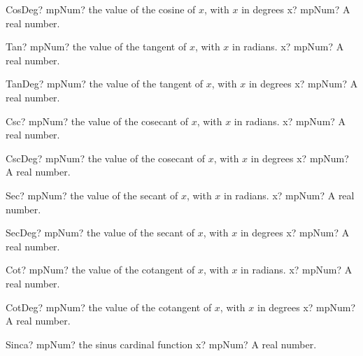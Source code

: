 \documentclass[12pt,a4paper,openany]{book}
\begin{document}
\begin{mpFunctionsExtract}
\mpFunctionOne
{CosDeg? mpNum? the value of the cosine of $x$, with $x$ in degrees}
{x? mpNum? A real number.}
\end{mpFunctionsExtract}

\begin{mpFunctionsExtract}
\mpFunctionOne
{Tan? mpNum? the value of the tangent of $x$, with $x$ in radians.}
{x? mpNum? A real number.}
\end{mpFunctionsExtract}

\begin{mpFunctionsExtract}
\mpFunctionOne
{TanDeg? mpNum? the value of the tangent of $x$, with $x$ in degrees}
{x? mpNum? A real number.}
\end{mpFunctionsExtract}

\begin{mpFunctionsExtract}
\mpFunctionOne
{Csc? mpNum? the value of the cosecant of $x$, with $x$ in radians.}
{x? mpNum? A real number.}
\end{mpFunctionsExtract}

\begin{mpFunctionsExtract}
\mpFunctionOne
{CscDeg? mpNum? the value of the cosecant of $x$, with $x$ in degrees}
{x? mpNum? A real number.}
\end{mpFunctionsExtract}

\begin{mpFunctionsExtract}
\mpFunctionOne
{Sec? mpNum? the value of the secant of $x$, with $x$ in radians.}
{x? mpNum? A real number.}
\end{mpFunctionsExtract}

\begin{mpFunctionsExtract}
\mpFunctionOne
{SecDeg? mpNum? the value of the secant of $x$, with $x$ in degrees}
{x? mpNum? A real number.}
\end{mpFunctionsExtract}

\begin{mpFunctionsExtract}
\mpFunctionOne
{Cot? mpNum? the value of the cotangent of $x$, with $x$ in radians.}
{x? mpNum? A real number.}
\end{mpFunctionsExtract}

\begin{mpFunctionsExtract}
\mpFunctionOne
{CotDeg? mpNum? the value of the cotangent of $x$, with $x$ in degrees}
{x? mpNum? A real number.}
\end{mpFunctionsExtract}

\begin{mpFunctionsExtract}
\mpFunctionOne
{Sinca? mpNum? the sinus cardinal function}
{x? mpNum? A real number.}
\end{mpFunctionsExtract}
\end{document}
